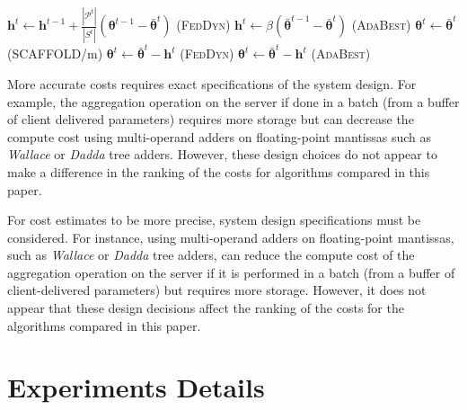 \documentclass[runningheads]{llncs}
\def\vtheta{{\bm{\theta}}}
\def\vh{{\bm{h}}}
\def\gP{{\mathcal{P}}}
\newcommand*\mean[1]{\bar{#1}}
\newcommand{\scaffold}{\textsc{SCAFFOLD}\xspace}
\newcommand{\feddyn}{\textsc{FedDyn}\xspace}
\newcommand{\ours}{\textsc{AdaBest}\xspace}
\begin{document}
\begin{algorithm}
\begin{spacing}{1.2}
\begin{algorithmic}
   \STATE \colorbox{blue!20}{$\vh^{t} \leftarrow \vh^{t-1} +\frac{|\gP^t|}{|S^t|}({\vtheta}^{t-1}-\mean{\vtheta}^t)$ (\feddyn)} 
   \STATE \colorbox{green!30}{$\vh^t \leftarrow \beta(\mean{\vtheta}^{t-1}-\mean{\vtheta}^t)$ (\ours)} 
  \STATE \colorbox{red!30} {$\vtheta^{t} \leftarrow \mean{\vtheta}^{t}$ (\scaffold/m)} 
  \STATE \colorbox{blue!20} {$\vtheta^{t} \leftarrow \mean{\vtheta}^{t} - \vh^t$ (\feddyn)} 
\colorbox{green!30} {$\vtheta^{t} \leftarrow \mean{\vtheta}^{t} - \vh^t$ (\ours)} 
   \ENDFOR
\end{algorithmic}
\end{spacing}
\end{algorithm}


More accurate costs requires exact specifications of the system design. For example, the aggregation operation on the server if done in a batch (from a buffer of client delivered parameters) requires more storage but can decrease the compute cost using multi-operand adders on floating-point mantissas such as \emph{Wallace} or \emph{Dadda} tree adders. However, these design choices do not appear to make a difference in the ranking of the costs for algorithms compared in this paper. 

For cost estimates to be more precise, system design specifications must be considered. For instance, using multi-operand adders on floating-point mantissas, such as \emph{Wallace} or \emph{Dadda} tree adders, can reduce the compute cost of the aggregation operation on the server if it is performed in a batch (from a buffer of client-delivered parameters) but requires more storage. However, it does not appear that these design decisions affect the ranking of the costs for the algorithms compared in this paper.

\section{Experiments Details}
\end{document}
